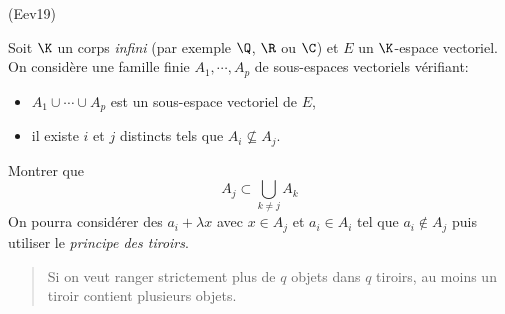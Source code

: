 \begin{tiny}(Eev19)\end{tiny} Soit $\K$ un corps \emph{infini} (par exemple $\Q$, $\R$ ou $\C$) et $E$ un $\K$-espace vectoriel. On considère une famille finie $A_1,\cdots, A_p$ de sous-espaces vectoriels vérifiant:
\begin{itemize}
  \item $A_1 \cup \cdots \cup A_p$ est un sous-espace vectoriel de $E$,
  \item il existe $i$ et $j$ distincts tels que $A_i \nsubseteq A_j$.
\end{itemize}
Montrer que 
\begin{displaymath}
  A_j \subset \bigcup_{k\neq j} A_k
\end{displaymath}
On pourra considérer des $a_i + \lambda x$ avec $x\in A_j$ et $a_i\in A_i$ tel que $a_i\notin A_j$ puis utiliser le \emph{principe des tiroirs}. 
\begin{quote}
  Si on veut ranger strictement plus de $q$ objets dans $q$ tiroirs, au moins un tiroir contient plusieurs objets.
\end{quote}
